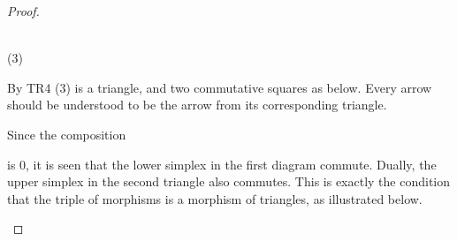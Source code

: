 \begin{proof}
\begin{center}
 \\
            (3)
        \end{center}
        By TR4 (3) is a triangle, and two commutative squares as below. Every arrow should be understood to be the arrow from its corresponding triangle.
        \begin{center}
        \end{center}
        Since the composition  is 0, it is seen that the lower simplex in the first diagram commute. Dually, the upper simplex in the second triangle also commutes. This is exactly the condition that the triple of morphisms is a morphism of triangles, as illustrated below.
        \begin{center}
        \end{center}
    \end{proof}

